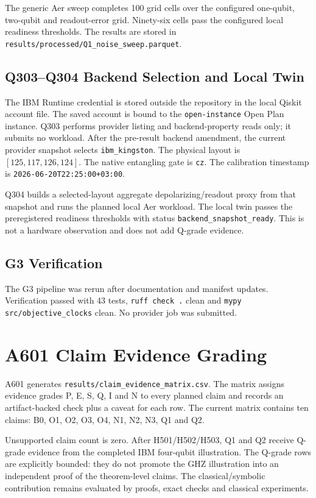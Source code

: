 \documentclass[11pt]{article}
\begin{document}
The generic Aer sweep completes 100 grid cells over the configured one-qubit,
two-qubit and readout-error grid. Ninety-six cells pass the configured local
readiness thresholds. The results are stored in
\texttt{results/processed/Q1\_noise\_sweep.parquet}.

\subsection{Q303--Q304 Backend Selection and Local Twin}

The IBM Runtime credential is stored outside the repository in the local Qiskit
account file. The saved account is bound to the \texttt{open-instance} Open
Plan instance. Q303 performs provider listing and backend-property reads only;
it submits no workload. After the pre-result backend amendment, the current
provider snapshot selects
\texttt{ibm\_kingston}. The physical layout is \([125,117,126,124]\). The
native entangling gate is \texttt{cz}. The calibration timestamp is
\texttt{2026-06-20T22:25:00+03:00}.

Q304 builds a selected-layout aggregate depolarizing/readout proxy from that
snapshot and runs the planned local Aer workload. The local twin passes the
preregistered readiness thresholds with status
\texttt{backend\_snapshot\_ready}. This is not a hardware observation and does
not add Q-grade evidence.

\subsection{G3 Verification}

The G3 pipeline was rerun after documentation and manifest updates. Verification
passed with 43 tests, \texttt{ruff check .} clean and
\texttt{mypy src/objective\_clocks} clean. No provider job was submitted.

\section{A601 Claim Evidence Grading}

A601 generates \texttt{results/claim\_evidence\_matrix.csv}. The matrix assigns
evidence grades P, E, S, Q, I and N to every planned claim and records an
artifact-backed check plus a caveat for each row. The current matrix contains ten
claims: B0, O1, O2, O3, O4, N1, N2, N3, Q1 and Q2.

Unsupported claim count is zero. After H501/H502/H503, Q1 and Q2 receive
Q-grade evidence from the completed IBM four-qubit illustration. The Q-grade
rows are explicitly bounded: they do not promote the GHZ illustration into an
independent proof of the theorem-level claims. The classical/symbolic
contribution remains evaluated by proofs, exact checks and classical
experiments.
\end{document}
